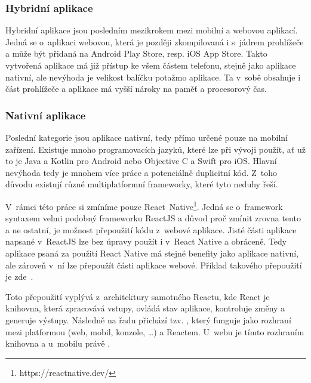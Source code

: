 \subsubsection*{Hybridní aplikace}
Hybridní aplikace jsou posledním mezikrokem mezi mobilní a webovou aplikací. Jedná se o~aplikaci webovou, která je později zkompilovaná i s~jádrem prohlížeče a může být přidaná na Android Play Store, resp. iOS App Store. Takto vytvořená aplikace má již přístup ke všem částem telefonu, stejně jako aplikace nativní, ale nevýhoda je velikost balíčku potažmo aplikace. Ta v~sobě obsahuje i část prohlížeče a aplikace má vyšší nároky na paměť a procesorový čas.

\subsubsection*{Nativní aplikace}
Poslední kategorie jsou aplikace nativní, tedy přímo určené pouze na mobilní zařízení. Existuje mnoho programovacích jazyků, které lze při vývoji použít, ať už to je Java a Kotlin pro Android nebo Objective C a Swift pro iOS. Hlavní nevýhoda tedy je mnohem více práce a potenciálně duplicitní kód. Z~toho důvodu existují různé multiplatformní frameworky, které tyto neduhy řeší.

V~rámci této práce si zmíníme pouze React~Native\footnote{https://reactnative.dev/}. Jedná se o~framework syntaxem velmi podobný frameworku ReactJS a důvod proč zmínit zrovna tento a ne ostatní, je možnost přepoužití kódu z~webové aplikace. Jisté části aplikace napsané v~ReactJS lze bez úpravy použít i v~React Native a obráceně. Tedy aplikace psaná za použití React Native má stejné benefity jako aplikace nativní, ale zároveň v~ní lze přepoužít části aplikace webové. Příklad takového přepoužití je zde~\cite{sepulveda_2017_share}.

Toto přepoužití vyplývá z~architektury samotného Reactu, kde React je knihovna, která zpracovává vstupy, ovládá stav aplikace, kontroluje změny a generuje výstupy. Následně na řadu přichází tzv. , který funguje jako rozhraní mezi platformou (web, mobil, konzole, \ldots{}) a Reactem. U~webu je tímto rozhraním knihovna  a u~mobilu právě .

